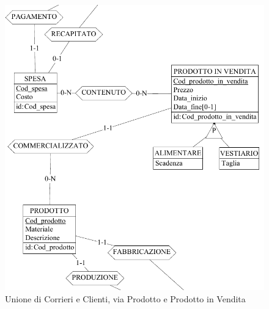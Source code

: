 \documentclass[a4paper,12pt]{report}
\begin{document}
\begin{figure}[H]
	\centering{}
	\includegraphics[width=\textwidth]{img/Unione-Clienti-Produttori2.pdf}
	\caption{Unione di Corrieri e Clienti, via Prodotto e Prodotto in Vendita}
\end{figure}
\end{document}

